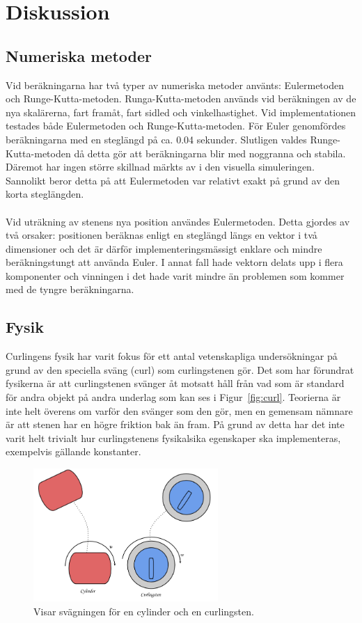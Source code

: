 \documentclass[11pt]{article} %
\begin{document}
\pagebreak

\section{Diskussion}

\subsection{Numeriska metoder}
Vid beräkningarna har två typer av numeriska metoder använts: Eulermetoden och Runge-Kutta-metoden. Runga-Kutta-metoden används vid beräkningen av de nya skalärerna, fart framåt, fart sidled och vinkelhastighet.
Vid implementationen testades både Eulermetoden och Runge-Kutta-metoden. 
För Euler genomfördes beräkningarna med en steglängd på ca. 0.04 sekunder. 
Slutligen valdes Runge-Kutta-metoden då detta gör att beräkningarna blir med noggranna och stabila. 
Däremot har ingen större skillnad märkts av i den visuella simuleringen. 
Sannolikt beror detta på att Eulermetoden var relativt exakt på grund av den korta steglängden. 
\\\\Vid uträkning av stenens nya position användes Eulermetoden. 
Detta gjordes av två orsaker: positionen beräknas enligt en steglängd längs en vektor i två dimensioner och det är därför implementeringsmässigt enklare och mindre beräkningstungt att använda Euler. 
I annat fall hade vektorn delats upp i flera komponenter och vinningen i det hade varit mindre än problemen som kommer med de tyngre beräkningarna. 

\subsection{Fysik}
Curlingens fysik har varit fokus för ett antal vetenskapliga undersökningar på grund av den speciella sväng (curl) som curlingstenen gör. Det som har förundrat fysikerna är att curlingstenen svänger åt motsatt håll från vad som är standard för andra objekt på andra underlag som kan ses i Figur~\ref{fig:curl}. Teorierna är inte helt överens om varför den svänger som den gör, men en gemensam nämnare är att stenen har en högre friktion bak än fram. På grund av detta har det inte varit helt trivialt hur curlingstenens fysikalsika egenskaper ska implementeras, exempelvis gällande konstanter.

\begin{figure}[ht!]
\centering
\includegraphics[width=70mm]{curl.png}
\caption{Visar svägningen för en cylinder och en curlingsten. }
\label{fig:curl}
\label{overflow}
\end{figure}
\end{document}
